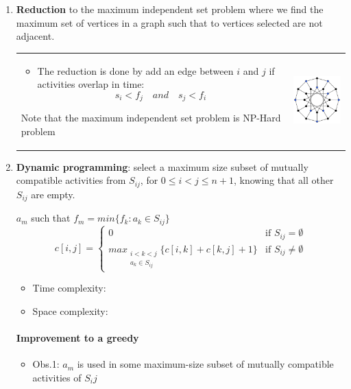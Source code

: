 \begin{enumerate}
    \item \textbf{Reduction} to the maximum independent set problem where 
        we find the maximum set of vertices in a graph such that
        to vertices selected are not adjacent.

        \begin{tabular}{m{10cm}m{3cm}}
            \begin{itemize}
                \item The reduction is done by add an edge between $i$ and $j$ if
                    activities overlap in time: 
                    $$s_i < f_j \quad and \quad s_j < f_i$$ 
            \end{itemize}
            Note that the maximum independent set problem is NP-Hard problem
            &
            \includegraphics[width=3cm]{img/independant}
        \end{tabular}


    \item \textbf{Dynamic programming}: select a maximum size subset of mutually
        compatible activities from $S_{ij}$, for $0 \leq i < j \leq n+1$,
        knowing that all other $S_{ij}$ are empty.

        $a_m$ such that $f_m = min\{f_k: a_k \in S_{ij}\}$
        \[
            c[i, j] = 
            \begin{cases} 
                0 & \text{if } S_{ij} = \emptyset \\
                max_{\substack{i<k<j \\ a_k \in S_{ij}}} \{c[i, k] + c[k, j] + 1\}  & \text{if } S_{ij} \neq \emptyset
            \end{cases}
        \]
        \begin{itemize}
            \item Time complexity: 
            \item Space complexity: 
        \end{itemize}

        \paragraph{Improvement to a greedy}
        \begin{itemize}
            \item Obs.1: $a_m$ is used in some maximum-size subset of
                mutually compatible activities of $S_ij$


\end{itemize}
\end{enumerate}
